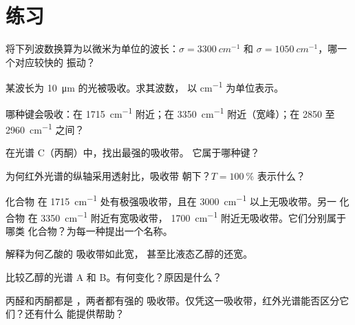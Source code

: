 \section{练习}

\begin{exercise}[$\star$]\label{exo:g11:infrared:1}
将下列波数换算为以微米为单位的波长：$\sigma = \qty{3300}{cm^{-1}}$
和 $\sigma = \qty{1050}{cm^{-1}}$，哪一个对应较快的
振动？
\end{exercise}

\begin{exercise}[$\star$]\label{exo:g11:infrared:2}
某波长为 \qty{10}{\micro m} 的光被吸收。求其波数，
以 \si{cm^{-1}} 为单位表示。
\end{exercise}

\begin{exercise}[$\star$]\label{exo:g11:infrared:3}
哪种键会吸收：在 \qty{1715}{cm^{-1}} 附近；在 \qty{3350}{cm^{-1}}
附近（宽峰）；在 2850 至 \qty{2960}{cm^{-1}} 之间？
\end{exercise}

\begin{exercise}[$\star$]\label{exo:g11:infrared:4}
在光谱 C（丙酮）中，找出最强的吸收带。
它属于哪种键？
\end{exercise}

\begin{exercise}[$\star$]\label{exo:g11:infrared:5}
为何红外光谱的纵轴采用透射比，吸收带
朝下？$T = \qty{100}{\percent}$ 表示什么？
\end{exercise}

\begin{exercise}[$\star\star$]\label{exo:g11:infrared:6}
化合物  在
\qty{1715}{cm^{-1}} 处有极强吸收带，且在 \qty{3000}{cm^{-1}} 以上无吸收带。另一
化合物  在 \qty{3350}{cm^{-1}} 附近有宽吸收带，
\qty{1700}{cm^{-1}} 附近无吸收带。它们分别属于哪类
化合物？为每一种提出一个名称。
\end{exercise}

\begin{exercise}[$\star\star$]\label{exo:g11:infrared:7}
解释为何乙酸的  吸收带如此宽，
甚至比液态乙醇的还宽。
\end{exercise}

\begin{exercise}[$\star\star$]\label{exo:g11:infrared:8}
比较乙醇的光谱 A 和 B。有何变化？原因是什么？
\end{exercise}

\begin{exercise}[$\star\star$]\label{exo:g11:infrared:9}
丙醛和丙酮都是 ，两者都有强的 
吸收带。仅凭这一吸收带，红外光谱能否区分它们？还有什么
能提供帮助？
\end{exercise}

